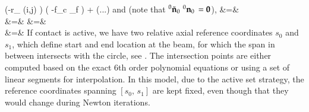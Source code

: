     \left(-r_ {(i,j)} \cdot {} \right) \left( -f_c \cdot \delta_f  \right) +  (...)
\eea
and (note that $\prescript{0}{}{\tilde {\mathbf{n}}_0}\, \prescript{0}{}{\mathbf{n}_0}\, = \mathbf{0}$),
\bea
   &=& \nonumber\\
   &=&
\eea
\bea
   &=& \nonumber\\
   &=&
\eea
%
\noindent If contact is active, we have two relative axial reference coordinates $s_0$ and $s_1$, which define start and end location at the beam, for which the span in between intersects with the circle, see .
The intersection points are either computed based on the exact 6th order polynomial equations or using a set of linear segments for interpolation.
In this model, due to the active set strategy, the reference coordinates spanning $[s_0,\, s_1]$ are kept fixed, even though that they would change during Newton iterations.

